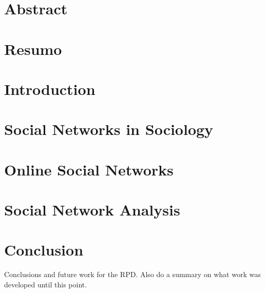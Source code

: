 \documentclass[
  oneside,
  11pt, a4paper,
  footinclude=true,
  headinclude=true,
  cleardoublepage=empty
]{scrbook}
\author{Jorge Caldas}
\date{\myear}
\begin{document}
	\umfrontcover
	\umtitlepage

	\chapter*{Abstract}
	
	
	\cleardoublepage
	\chapter*{Resumo}
	
	
	\tableofcontents
	
	
	\listoffigures
	\listoftables
	\printglossary[type=\acronymtype]
	\clearpage
	\thispagestyle{empty}
	
	
	\chapter{Introduction}
	
	
	
	\chapter{Social Networks in Sociology}
	
	
	
	\chapter{Online Social Networks}
	
	
	
	\chapter{Social Network Analysis}
	

	\chapter{Conclusion}
	Conclusions and future work for the RPD. Also do a summary on what work was developed until this point.
			
	\cleardoublepage

	
\end{document}
